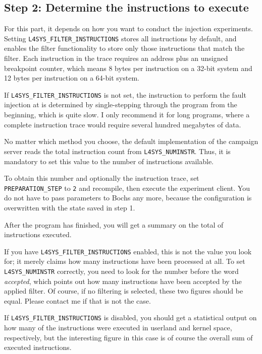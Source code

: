 \documentclass[a4paper,times,9pt]{article}
\begin{document}
\subsection{Step 2: Determine the instructions to execute}

For this part, it depends on how you want to conduct the injection
experiments. Setting \verb+L4SYS_FILTER_INSTRUCTIONS+
stores all instructions by default, and
enables the filter functionality to store only those
instructions that match the filter.
Each instruction in the trace requires
an address plus an unsigned breakpoint counter,
which means 8 bytes per instruction on a 32-bit system
and 12 bytes per instruction on a 64-bit system.

If \verb+L4SYS_FILTER_INSTRUCTIONS+ is not set, the instruction
to perform the fault injection at is determined by single-stepping
through the program from the beginning, which is quite slow.
I only recommend it for long programs, where a complete
instruction trace would require several hundred megabytes of data.

No matter which method you choose, the default implementation
of the campaign server reads the total instruction count
from \verb+L4SYS_NUMINSTR+. Thus, it is mandatory to set this
value to the number of instructions available.

To obtain this number and optionally the instruction trace,
set \verb+PREPARATION_STEP+ to \texttt{2} and recompile, then execute
the experiment client. You do not have to pass parameters to Bochs
any more, because the configuration is overwritten with the
state saved in step 1.

After the program has finished, you will get a summary on the
total of instructions executed.

If you have
\verb+L4SYS_FILTER_INSTRUCTIONS+ enabled, this is not the
value you look for; it merely claims how many
instructions have been processed at all.
To set \verb+L4SYS_NUMINSTR+ correctly, you need to look for the
number before the word \emph{accepted}, which points out how many
instructions have been accepted by the applied filter. Of course,
if no filtering is selected, these two figures should be equal.
Please contact me if that is not the case.

If \verb+L4SYS_FILTER_INSTRUCTIONS+ is disabled, you should
get a statistical output on how many of the instructions
were executed in userland and kernel space, respectively,
but the interesting figure in this case is of course the overall
sum of executed instructions.
\end{document}
